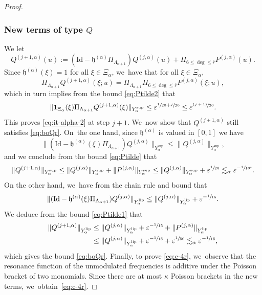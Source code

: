 \documentclass[10pt,a4paper]{amsart}
\newcommand{\psfrac}[2]{\sfrac{(#1)}{#2}}
\theoremstyle{plain}
\theoremstyle{definition}
\newcommand{\1}{\mathbf{1}}
\newcommand{\Ysup}[1]{Y_{#1}^{\mathrm{sup}}}
\newcommand{\Ylip}[1]{Y_{#1}^{\mathrm{lip}}}
\let\epsilon\varepsilon
\begin{document}
\begin{proof}
\subsubsection*{New terms of type $Q$}
We let
\[
Q^{(j+1,\alpha)}(u) := (\mathrm{Id}-\mathfrak{h}^{(\alpha)}\Pi_{\Lambda_{\alpha+1}})Q^{(j,\alpha)}(u) + \Pi_{6\leq\deg\leq\overline{r}}P^{(j,\alpha)}(u).
\]
Since $\mathfrak{h}^{(\alpha)}(\xi)=1$ for all $\xi\in\Xi_{\alpha}$, we~have that for all $\xi\in\Xi_{\alpha}$,
\[
\Pi_{\Lambda_{\alpha+1}}Q^{(j+1,\alpha)}(\xi;u)
= \Pi_{{\Lambda}_{\alpha+1}}\Pi_{6\leq\deg\leq\overline{r}}P^{(j,\alpha)}(\xi;u),
\]
which in turn implies from the bound \eqref{eq:Ptilde2} that
\[
\|\mathbf{1}_{\Xi_{\alpha}}(\xi)\Pi_{\Lambda_{\alpha+1}}Q^{(j+1,\alpha)}(\xi) \|_{\Ysup{\alpha}}
\leq \epsilon^{\sfrac{1}{20}+\sfrac{j}{30}} \leq \epsilon^{\psfrac{j+1}{30}}.
\]
This proves \eqref{eq:it-alpha-2} at step $j+1$. We~now show that $Q^{(j+1,\alpha)}$ still satisfies \eqref{eq:boQr}. On~the one hand, since $\mathfrak{h}^{(\alpha)}$ is valued in $[0,1]$ we have
\[
\|(\mathrm{Id}-\mathfrak{h}^{(\alpha)}(\xi)\Pi_{\Lambda_{\alpha+1}})Q^{(j,\alpha)}\|_{\Ysup{\alpha}} \leq \|Q^{(j,\alpha)}\|_{\Ysup{\alpha}},
\]
and we conclude from the bound \eqref{eq:Ptilde} that
\[
\|Q^{(j+1,\alpha)}\|_{\Ysup{\alpha}}
\leq \|Q^{(j,\alpha)}\|_{\Ysup{\alpha}}
+\|P^{(j,\alpha)}\|_{\Ysup{\alpha}}
\leq
\|Q^{(j,\alpha)}\|_{\Ysup{\alpha}} + \epsilon^{\sfrac{1}{20}} \lesssim_{\alpha}\epsilon^{-\sfrac{1}{10^{4}}}.
\]
On the other hand, we~have from the chain rule and bound that
\[
\|(\mathrm{Id}-\mathfrak{h}^{(\alpha)}(\xi)\Pi_{\Lambda_{\alpha+1}})Q^{(j,\alpha)}\|_{\Ylip{\alpha}}
\leq \|Q^{(j,\alpha)}\|_{\Ylip{\alpha}}
+ \epsilon^{-\sfrac{1}{15}}.
\]
We deduce from the bound \eqref{eq:Ptilde1} that
\begin{align*}
\|Q^{(j+1,\alpha)}\|_{\Ylip{\alpha}} &\leq \|Q^{(j,\alpha)}\|_{\Ylip{\alpha}}
+ \epsilon^{-\sfrac{1}{15}} + \|P^{(j,\alpha)}\|_{\Ylip{\alpha}}\\
&\leq
\|Q^{(j,\alpha)}\|_{\Ylip{\alpha}}
+
\epsilon^{-\sfrac{1}{15}}
+
\epsilon^{\sfrac{1}{50}} \lesssim_{\alpha}\epsilon^{-\sfrac{1}{15}},
\end{align*}
which gives the bound \eqref{eq:boQr}. Finally, to prove \eqref{eq:c-4r}, we~observe that the resonance function of the unmodulated frequencies is additive under the Poisson bracket of two monomials. Since there are at most $\kappa$ Poisson brackets in the new terms, we~obtain~\eqref{eq:c-4r}.


\end{proof}
\end{document}
